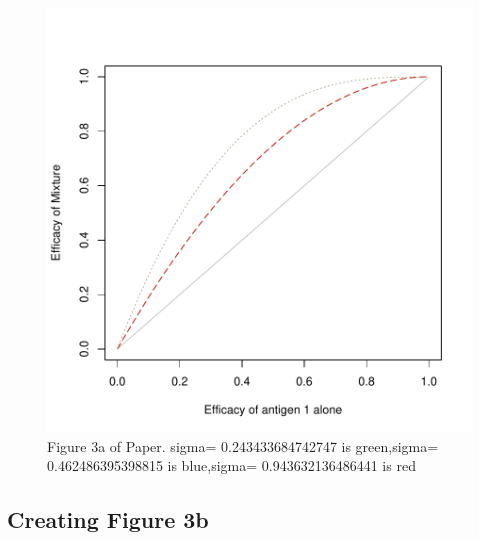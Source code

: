 \documentclass{article}[12pt]
\begin{document}
\begin{figure}
\caption{Figure 3a of Paper.
sigma= 0.243433684742747  is  green,sigma= 0.462486395398815  is  blue,sigma= 0.943632136486441  is  red
 \label{fig:3a} }
\includegraphics{hbimdetails-fig3a}
\end{figure}



\subsection{Creating Figure 3b}
\end{document}
